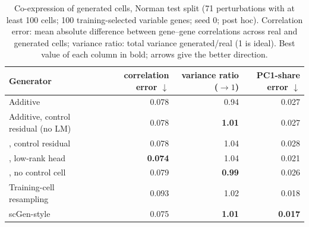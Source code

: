 \begin{table}[!htb]
\centering
\small
\setlength{\tabcolsep}{4pt}
\begin{tabular}{lrrr}
\toprule
Generator & correlation error $\downarrow$ & variance ratio ($\to1$) & PC1-share error $\downarrow$ \\
\midrule
Additive & 0.078 & 0.94 & 0.027 \\
Additive, control residual (no LM) & 0.078 & \textbf{1.01} & 0.027 \\
\rowcolor{ours}\cad{}, control residual & 0.078 & 1.04 & 0.028 \\
\rowcolor{ours}\cad{}, low-rank head & \textbf{0.074} & 1.04 & 0.021 \\
\rowcolor{ours}\cad{}, no control cell & 0.079 & \textbf{0.99} & 0.026 \\
Training-cell resampling & 0.093 & 1.02 & 0.018 \\
scGen-style & 0.075 & \textbf{1.01} & \textbf{0.017} \\
\bottomrule
\end{tabular}
\caption{Co-expression of generated cells, Norman test split (71 perturbations with at least 100 cells; 100 training-selected variable genes; seed 0; post hoc). Correlation error: mean absolute difference between gene--gene correlations across real and generated cells; variance ratio: total variance generated/real (1 is ideal). Best value of each column in bold; arrows give the better direction.}
\label{tab:coexpr}
\end{table}
